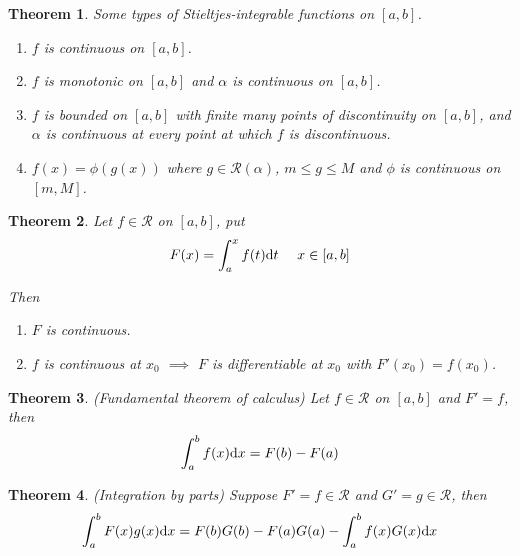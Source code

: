 \documentclass[aps,pra,onecolumn,notitlepage,superscriptaddress]{revtex4-1}
\def\d{{\rm d}}
\newtheorem{theo}{Theorem}
\begin{document}
    \begin{theo}
        Some types of Stieltjes-integrable functions on $[a,b]$.
        \begin{enumerate}
            \item $f$ is continuous on $[a,b]$.
            \item $f$ is monotonic on $[a,b]$ and $\alpha$ is continuous on $[a,b]$.
            \item $f$ is bounded on $[a,b]$ with finite many points of discontinuity on $[a,b]$, and $\alpha$ is continuous at every point at which $f$ is discontinuous.
            \item $f(x) = \phi(g(x))$ where $g \in \mathscr{R}(\alpha)$, $m \leq g \leq M$ and $\phi$ is continuous on $[m,M]$.
        \end{enumerate}
    \end{theo}

    \begin{theo}
        Let $f \in \mathscr{R}$ on $[a,b]$, put
        \begin{equation}
            F(x) = \int_a^x f(t) \d t \ \ \ \ x \in [a,b]
        \end{equation}

        Then 
        \begin{enumerate}
            \item $F$ is continuous.
            \item $f$ is continuous at $x_0$ $\implies$ $F$ is differentiable at $x_0$ with $F'(x_0)=f(x_0)$.
        \end{enumerate}
        
    \end{theo}

    \begin{theo} (Fundamental theorem of calculus)
        Let $f \in \mathscr{R}$ on $[a,b]$ and $F' = f$, then
        \begin{equation}
            \int_a^b f(x) \d x = F(b)-F(a)
        \end{equation}
    \end{theo}

    \begin{theo} (Integration by parts)
        Suppose $F'=f\in \mathscr{R}$ and $G'=g\in \mathscr{R}$, then
        \begin{equation}
            \int_a^b F(x)g(x) \d x = F(b)G(b)-F(a)G(a)-\int_a^b f(x)G(x) \d x
        \end{equation}
    \end{theo}
\end{document}
